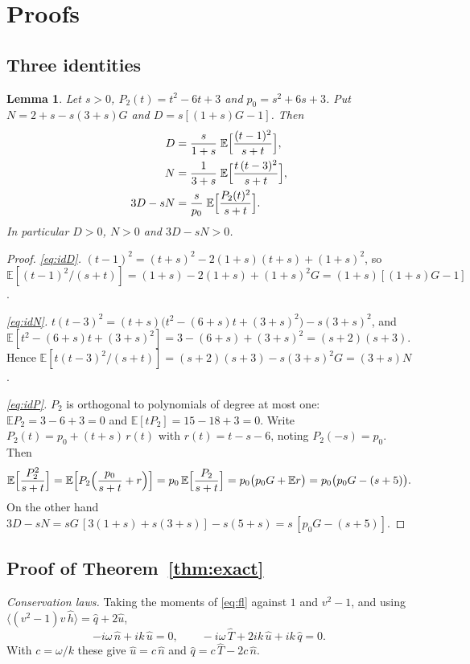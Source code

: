 \documentclass[11pt]{article}
\newcommand{\E}{\mathbb{E}}
\newcommand{\avg}[1]{\langle #1\rangle}
\newtheorem{lemma}[theorem]{Lemma}
\theoremstyle{remark}
\begin{document}
\section{Proofs}

\subsection{Three identities}

\begin{lemma}\label{lem:id}
Let $s>0$, $P_2(t) = t^2-6t+3$ and $p_0 = s^2+6s+3$. Put
$N = 2+s-s(3+s)G$ and $D = s[(1+s)G-1]$. Then
\begin{align}
  D &= \frac{s}{1+s}\;\E\Bigl[\frac{(t-1)^2}{s+t}\Bigr], \label{eq:idD}\\
  N &= \frac{1}{3+s}\;\E\Bigl[\frac{t\,(t-3)^2}{s+t}\Bigr], \label{eq:idN}\\
  3D - sN &= \frac{s}{p_0}\;\E\Bigl[\frac{P_2(t)^2}{s+t}\Bigr]. \label{eq:idP}
\end{align}
In particular $D>0$, $N>0$ and $3D-sN>0$.
\end{lemma}

\begin{proof}
\emph{\eqref{eq:idD}.} $(t-1)^2 = (t+s)^2 - 2(1+s)(t+s) + (1+s)^2$, so
$\E[(t-1)^2/(s+t)] = (1+s) - 2(1+s) + (1+s)^2G = (1+s)[(1+s)G-1]$.

\emph{\eqref{eq:idN}.}
$t(t-3)^2 = (t+s)\bigl(t^2-(6+s)t+(3+s)^2\bigr) - s(3+s)^2$, and
$\E[t^2-(6+s)t+(3+s)^2] = 3-(6+s)+(3+s)^2 = (s+2)(s+3)$. Hence
$\E[t(t-3)^2/(s+t)] = (s+2)(s+3) - s(3+s)^2G = (3+s)N$.

\emph{\eqref{eq:idP}.} $P_2$ is orthogonal to polynomials of degree at most
one: $\E P_2 = 3-6+3 = 0$ and $\E[tP_2] = 15-18+3 = 0$. Write
$P_2(t) = p_0 + (t+s)\,r(t)$ with $r(t) = t-s-6$, noting $P_2(-s) = p_0$.
Then
\[
  \E\Bigl[\frac{P_2^2}{s+t}\Bigr]
  = \E\Bigl[P_2\Bigl(\frac{p_0}{s+t} + r\Bigr)\Bigr]
  = p_0\,\E\Bigl[\frac{P_2}{s+t}\Bigr]
  = p_0\bigl(p_0G + \E r\bigr) = p_0\bigl(p_0G - (s+5)\bigr).
\]
On the other hand
$3D-sN = sG\,[3(1+s)+s(3+s)] - s(5+s) = s\,[p_0G-(s+5)]$.
\end{proof}

\subsection{Proof of Theorem~\ref{thm:exact}}

\emph{Conservation laws.} Taking the moments of \eqref{eq:fl} against $1$ and
$v^2-1$, and using $\avg{(v^2-1)v\,\hat h} = \hat q + 2\hat u$,
\begin{equation}
  -i\omega\,\hat n + ik\,\hat u = 0, \qquad
  -i\omega\,\hat T + 2ik\,\hat u + ik\,\hat q = 0 .
  \label{eq:cons}
\end{equation}
With $c = \omega/k$ these give $\hat u = c\,\hat n$ and
$\hat q = c\,\hat T - 2c\,\hat n$.
\end{document}
